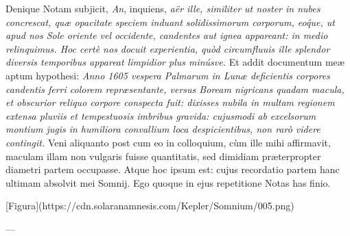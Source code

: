 \documentclass[a4paper, 11pt, oneside, polutonikogreek, german]{article}
\begin{document}
Denique Notam subjicit, \emph{An}, inquiens, \emph{aër ille, similiter ut noster in nubes concrescat, quæ opacitate speciem induant solidissimorum corporum, eo\'que, ut apud nos Sole oriente vel occidente, candentes aut ignea appareant: in medio relinquimus. Hoc certè nos docuit experientia, quòd circumfluuis ille splendor diversis temporibus appareat limpidior plus minúsve.} Et addit documentum meæ aptum hypothesi: \emph{Anno 1605 vespera Palmarum in Lunæ deficientis corpores candentis ferri colorem repræsentante, versus Boream nigricans quadam macula, et obscurior reliquo corpore conspecta fuit: dixisses nubila in multam regionem extensa pluviis et tempestuosis imbribus gravida: cujusmodi ab excelsorum montium jugis in humiliora convallium loca despicientibus, non rarò videre contingit.} Veni aliquanto post cum eo in colloquium, cùm ille mihi affirmavit, maculam illam non vulgaris fuisse quantitatis, sed dimidiam præterpropter diametri partem occupasse. Atque hoc ipsum est: cujus recordatio partem hanc ultimam absolvit mei Somnij. Ego quoque in ejus repetitione Notas has finio.

[Figura](https://cdn.solaranamnesis.com/Kepler/Somnium/005.png)

---
\clearpage
\end{document}
